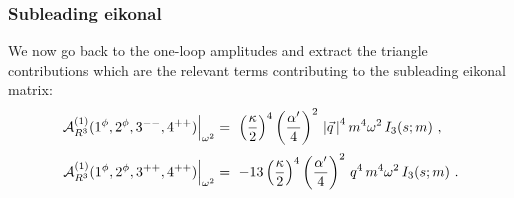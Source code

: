 \documentclass[a4paper,11pt]{article}
\numberwithin{equation}{section}
\begin{document}
\subsubsection{Subleading eikonal}
We now go back to the one-loop amplitudes and extract the triangle contributions which are the relevant terms contributing to the subleading eikonal matrix:
\begin{equation}
    \begin{split}
        \left. \mathcal{A}_{R^3}^{(1)} (1^\phi, 2^\phi, 3^{--}, 4^{++}) \right|_{\omega^2} &= \  \left({  \kappa\over 2} \right)^4 \left({  \alpha^\prime \over 4} \right)^2 \, \left| \vec{q}\, \right|^{4} m^4 \omega^2\, I_3 (s; m)  \ , \\[.2em]
        \left.\mathcal{A}_{R^3}^{(1)} (1^\phi, 2^\phi, 3^{++}, 4^{++}) \right|_{\omega^2} & = \ -13 \left({  \kappa\over 2} \right)^4 \left({  \alpha^\prime \over 4} \right)^2 \,   q^4 \, m^4 \omega^2\, I_3(s;m ) \ .
    \end{split}
\end{equation}
\end{document}
